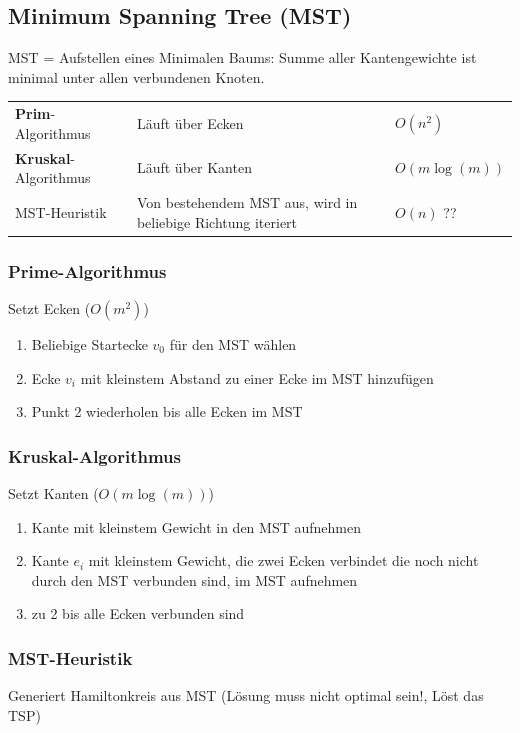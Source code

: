 	

	
	
  	


\subsection{Minimum Spanning Tree (MST)}

MST = Aufstellen eines Minimalen Baums: Summe aller Kantengewichte ist minimal unter allen verbundenen Knoten.
	
	\begin{tabularx}{\textwidth}{p{4cm} X p{4cm}}
	  \textbf{Prim}-Algorithmus
	    & Läuft über Ecken
	    & $O(n^2)$ \\
	  \textbf{Kruskal}-Algorithmus
	    & Läuft über Kanten
	    & $O(m \log(m))$\\
	  MST-Heuristik
	    & Von bestehendem MST aus, wird in beliebige Richtung iteriert
	    & $O(n)$ ??
	\end{tabularx}


\subsubsection{Prime-Algorithmus}
Setzt Ecken ($O(m^2)$)
\begin{enumerate}
	\item Beliebige Startecke $v_0$ für den MST wählen
	\item Ecke $v_i$ mit kleinstem Abstand zu einer Ecke im MST hinzufügen
	\item Punkt 2 wiederholen bis alle Ecken im MST
\end{enumerate}


\subsubsection{Kruskal-Algorithmus}
Setzt Kanten ($O(m \log(m))$)
\begin{enumerate}
	\item Kante mit kleinstem Gewicht in den MST aufnehmen
	\item Kante $e_i$ mit kleinstem Gewicht, die zwei Ecken verbindet die noch nicht durch den MST verbunden sind, im MST aufnehmen
	\item zu 2 bis alle Ecken verbunden sind
\end{enumerate}


\subsubsection{MST-Heuristik}
Generiert Hamiltonkreis aus MST (Lösung muss nicht optimal sein!, Löst das TSP)

